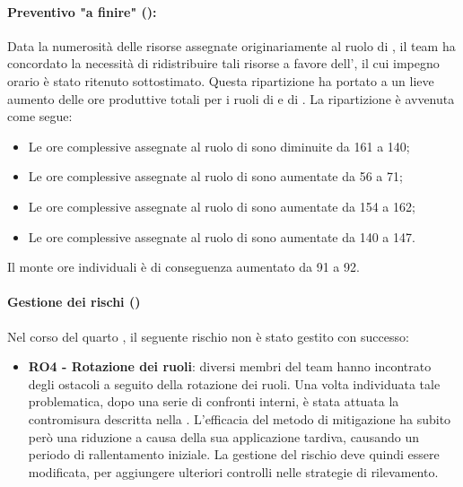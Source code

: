 \paragraph*{Preventivo "a finire" ():}
\par Data la numerosità delle risorse assegnate originariamente al ruolo di \Progettista{}, il team ha concordato la necessità di ridistribuire tali risorse a favore dell'\Amministratore{}, il cui impegno orario è stato ritenuto sottostimato. Questa ripartizione ha portato a un lieve aumento delle ore produttive totali per i ruoli di \Programmatore{} e di \Verificatore{}. 
La ripartizione è avvenuta come segue:
\begin{itemize}
  \item Le ore complessive assegnate al ruolo di \Progettista{} sono diminuite da 161 a 140;
  \item Le ore complessive assegnate al ruolo di \Amministratore{} sono aumentate da 56 a 71;
  \item Le ore complessive assegnate al ruolo di \Programmatore{} sono aumentate da 154 a 162;
  \item Le ore complessive assegnate al ruolo di \Verificatore{} sono aumentate da 140 a 147.
\end{itemize}
Il monte ore individuali è di conseguenza aumentato da 91 a 92.

\paragraph*{Gestione dei rischi ()}
\par Nel corso del quarto , il seguente rischio non è stato gestito con successo:
\begin{itemize}
  \item \textbf{RO4 - Rotazione dei ruoli}: diversi membri del team hanno incontrato degli ostacoli a seguito della rotazione dei ruoli. Una volta individuata tale problematica, dopo una serie di confronti interni, è stata attuata la contromisura descritta nella . L'efficacia del metodo di mitigazione ha subito però una riduzione a causa della sua applicazione tardiva, causando un periodo di rallentamento iniziale. La gestione del rischio deve quindi essere modificata, per aggiungere ulteriori controlli nelle strategie di rilevamento.
\end{itemize}

